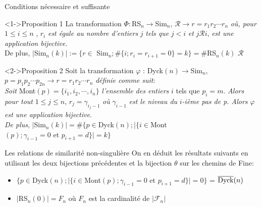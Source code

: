 \begin{frame}{Conditions nécessaire et suffisante}
    \transfade
    \begin{block}<1->{Proposition 1}
        La transformation $\Phi: $\rm{RS}$_{n} \rightarrow $\rm{Sim}$_{n}$, $\mathcal{R} \rightarrow r = r_{1}r_{2}\cdots r_{n}$ \textit{ où, pour }$1\leq i \leq n$ , $r_{i}$ \textit{est égale au nombre d'entiers} $j$ \textit{tels que} $j<i$ \textit{et} $j\mathcal{R}i$, \textit{est une application bijective.}\\ De plus, 
        $|$Sim$_{n}(k)|:=\{r \in $ Sim$_{n}; \#\{i; r_{i}=r_{i+1}=0\}=k\} = \#$RS$_{n}(k)$ 
         $\mathcal{R}$
    \end{block}
    \begin{block}<2->{Proposition 2}
        Soit la transformation $\varphi$ : $ $\rm{Dyck}$(n) \longrightarrow $\rm{Sim}$_n$, $p=p_{1}p_{2}\cdots p_{2n} \longrightarrow r=r_{1}r_{2}\cdots r_{n}$ \textit{définie comme suit}:\\
        \textit{Soit} \rm{Mont}$(p)=\{i_{1}, i_{2}, \cdots, i_{n}\}$ \textit{l'ensemble des entiers} $i$ tels que $p_{i}=m$. \textit{Alors pour tout }$1\leq j \leq n$, $r_{j} = \gamma_{i_{j}-1}$ \textit{où} $\gamma_{i-1}$ \textit{est le niveau du} $i$\textit{-ième pas de p.}
        \textit{Alors} $\varphi$ \textit{est une application bijective}.\\
        \textit{De plus}, $|$\rm{Sim}$_{n}(k)| = \# \{p \in $\rm{Dyck}$(n); |\{i \in $\rm{Mont}$(p); \gamma_{i-1}=0 \text{ et } p_{i+1}=d\}|=k\}$
    \end{block}
\end{frame}

\begin{frame}{Les relations de similarité non-singulière}
    On en déduit les résultats suivants en utilisant les deux bijections précédentes et la bijection $\theta$ sur les chemins de Fine:
    \begin{itemize}
        \item $\{p \in $\rm{Dyck}$(n); |\{i \in $\rm{Mont}$(p); \gamma_{i-1}=0 \text{ et } p_{i+1}=d\}|=0\}$ = $\overline{\rm{Dyck}}(n)$
        \item $|$RS$_{n}(0)|=F_{n}$ où $F_{n}$ est la cardinalité de $|\mathcal{F}_n|$
    \end{itemize}
\end{frame}


